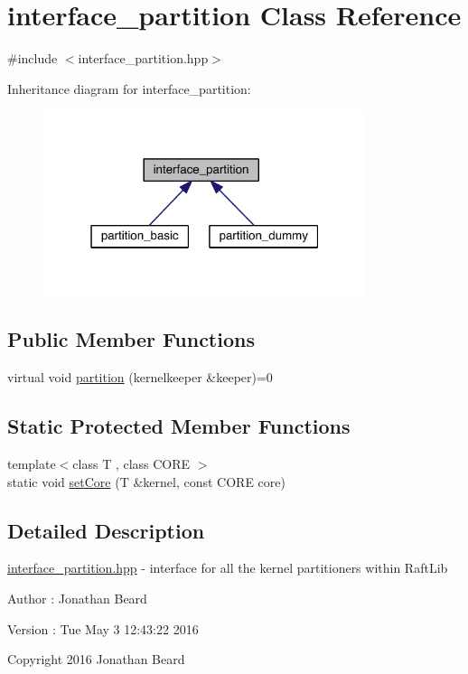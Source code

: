\hypertarget{classinterface__partition}{}\section{interface\+\_\+partition Class Reference}
\label{classinterface__partition}


{\ttfamily \#include $<$interface\+\_\+partition.\+hpp$>$}



Inheritance diagram for interface\+\_\+partition\+:
\nopagebreak
\begin{figure}[H]
\begin{center}
\leavevmode
\includegraphics[width=268pt]{classinterface__partition__inherit__graph}
\end{center}
\end{figure}
\subsection*{Public Member Functions}
\begin{DoxyCompactItemize}
\item 
virtual void \hyperlink{classinterface__partition_a7161f6277517624347fda38c8ffa019d}{partition} (kernelkeeper \&keeper)=0
\end{DoxyCompactItemize}
\subsection*{Static Protected Member Functions}
\begin{DoxyCompactItemize}
\item 
{\footnotesize template$<$class T , class C\+O\+RE $>$ }\\static void \hyperlink{classinterface__partition_af7c257c87d13508274e934328ee90f52}{set\+Core} (T \&kernel, const C\+O\+RE core)
\end{DoxyCompactItemize}


\subsection{Detailed Description}
\hyperlink{interface__partition_8hpp_source}{interface\+\_\+partition.\+hpp} -\/ interface for all the kernel partitioners within Raft\+Lib \begin{DoxyAuthor}{Author}
\+: Jonathan Beard 
\end{DoxyAuthor}
\begin{DoxyVersion}{Version}
\+: Tue May 3 12\+:43\+:22 2016
\end{DoxyVersion}
Copyright 2016 Jonathan Beard

